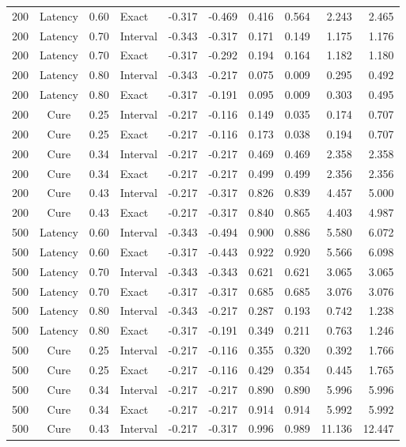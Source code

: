 \documentclass[12pt]{article}
\theoremstyle{definition}
\theoremstyle{remark}
\begin{document}
\begin{longtable}{rcrlrrrrrr}
200 & Latency & 0.60 & Exact & -0.317 & -0.469 & 0.416 & 0.564 & 2.243 & 2.465 \\
200 & Latency & 0.70 & Interval & -0.343 & -0.317 & 0.171 & 0.149 & 1.175 & 1.176 \\
200 & Latency & 0.70 & Exact & -0.317 & -0.292 & 0.194 & 0.164 & 1.182 & 1.180 \\
200 & Latency & 0.80 & Interval & -0.343 & -0.217 & 0.075 & 0.009 & 0.295 & 0.492 \\
200 & Latency & 0.80 & Exact & -0.317 & -0.191 & 0.095 & 0.009 & 0.303 & 0.495 \\
200 & Cure & 0.25 & Interval & -0.217 & -0.116 & 0.149 & 0.035 & 0.174 & 0.707 \\
200 & Cure & 0.25 & Exact & -0.217 & -0.116 & 0.173 & 0.038 & 0.194 & 0.707 \\
200 & Cure & 0.34 & Interval & -0.217 & -0.217 & 0.469 & 0.469 & 2.358 & 2.358 \\
200 & Cure & 0.34 & Exact & -0.217 & -0.217 & 0.499 & 0.499 & 2.356 & 2.356 \\
200 & Cure & 0.43 & Interval & -0.217 & -0.317 & 0.826 & 0.839 & 4.457 & 5.000 \\
200 & Cure & 0.43 & Exact & -0.217 & -0.317 & 0.840 & 0.865 & 4.403 & 4.987 \\
500 & Latency & 0.60 & Interval & -0.343 & -0.494 & 0.900 & 0.886 & 5.580 & 6.072 \\
500 & Latency & 0.60 & Exact & -0.317 & -0.443 & 0.922 & 0.920 & 5.566 & 6.098 \\
500 & Latency & 0.70 & Interval & -0.343 & -0.343 & 0.621 & 0.621 & 3.065 & 3.065 \\
500 & Latency & 0.70 & Exact & -0.317 & -0.317 & 0.685 & 0.685 & 3.076 & 3.076 \\
500 & Latency & 0.80 & Interval & -0.343 & -0.217 & 0.287 & 0.193 & 0.742 & 1.238 \\
500 & Latency & 0.80 & Exact & -0.317 & -0.191 & 0.349 & 0.211 & 0.763 & 1.246 \\
500 & Cure & 0.25 & Interval & -0.217 & -0.116 & 0.355 & 0.320 & 0.392 & 1.766 \\
500 & Cure & 0.25 & Exact & -0.217 & -0.116 & 0.429 & 0.354 & 0.445 & 1.765 \\
500 & Cure & 0.34 & Interval & -0.217 & -0.217 & 0.890 & 0.890 & 5.996 & 5.996 \\
500 & Cure & 0.34 & Exact & -0.217 & -0.217 & 0.914 & 0.914 & 5.992 & 5.992 \\
500 & Cure & 0.43 & Interval & -0.217 & -0.317 & 0.996 & 0.989 & 11.136 & 12.447 \\

\end{longtable}
\end{document}
